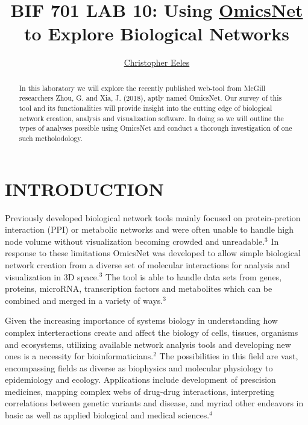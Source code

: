 \documentclass[letterpaper, 10 pt, conference]{ieeeconf}  %
\title{\LARGE \bf
BIF 701 LAB 10: Using \href{https://www.omicsnet.ca/}{OmicsNet} to Explore Biological Networks
}
\author {\href{https://www.linkedin.com/in/christopher-eeles-430b8a168/}{Christopher Eeles}}
\begin{document}
\maketitle
\thispagestyle{empty}
\pagestyle{empty}

\begin{abstract}

In this laboratory we will explore the recently published web-tool from McGill researchers Zhou, G. and Xia, J. (2018), aptly named OmicsNet. Our survey of this tool and its functionalities will provide insight into the cutting edge of biological network creation, analysis and visualization software. In doing so we will outline the types of analyses possible using OmicsNet and conduct a thorough investigation of one such metholodology.

\end{abstract}

\section{INTRODUCTION}

Previously developed biological network tools mainly focused on protein-pretion interaction (PPI) or metabolic networks and were often unable to handle high node volume without visualization becoming crowded and unreadable.$^3$ In response to these limitations OmicsNet was developed to allow simple biological network creation from a diverse set of molecular interactions for analysis and visualization in 3D space.$^3$ The tool is able to handle data sets from genes, proteins, microRNA, transcription factors and metabolites which can be combined and merged in a variety of ways.$^3$ 

Given the increasing importance of systems biology in understanding how complex interteractions create and affect the biology of cells, tissues, organisms and ecosystems, utilizing available network analysis tools and developing new ones is a necessity for bioinformaticians.$^2$ The possibilities in this field are vast, encompassing fields as diverse as biophysics and molecular physiology to epidemiology and ecology. Applications include development of prescision medicines, mapping complex webs of drug-drug interactions, interpreting correlations between genetic variants and disease, and myriad other endeavors in basic as well as applied biological and medical sciences.$^4$
\end{document}

